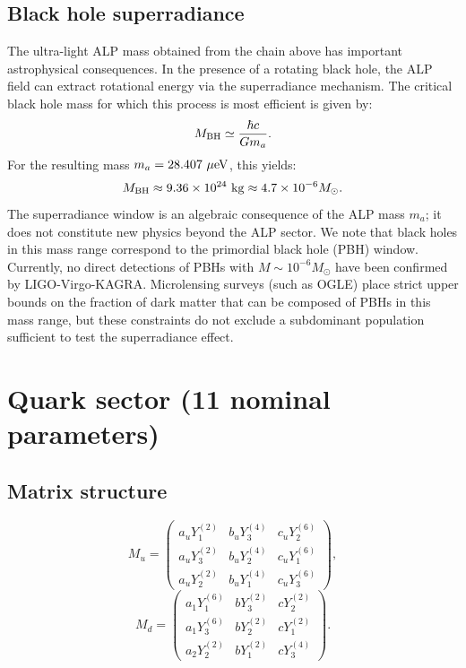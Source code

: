 \documentclass[12pt,a4paper]{article}
\numberwithin{equation}{section}
\begin{document}
\subsection{Black hole superradiance}
The ultra-light ALP mass obtained from the chain above has important astrophysical consequences. In the presence of a rotating black hole, the ALP field can extract rotational energy via the superradiance mechanism. The critical black hole mass for which this process is most efficient is given by:
\begin{equation}
M_{\rm BH}\simeq \frac{\hbar c}{Gm_a}.
\end{equation}
For the resulting mass \(m_a = 28.407~\mu{\rm eV}\), this yields:
\begin{equation}
M_{\rm BH}\approx 9.36\times 10^{24}~{\rm kg}\approx 4.7\times 10^{-6}M_{\odot}.
\end{equation}
The superradiance window is an algebraic consequence of the ALP mass \(m_a\); it does not constitute new physics beyond the ALP sector. We note that black holes in this mass range correspond to the primordial black hole (PBH) window. Currently, no direct detections of PBHs with \(M\sim 10^{-6}M_{\odot}\) have been confirmed by LIGO-Virgo-KAGRA. Microlensing surveys (such as OGLE) place strict upper bounds on the fraction of dark matter that can be composed of PBHs in this mass range, but these constraints do not exclude a subdominant population sufficient to test the superradiance effect.

\section{Quark sector (11 nominal parameters)}
\subsection{Matrix structure}
\begin{equation}
M_u = \begin{pmatrix}
a_u Y_1^{(2)} & b_u Y_3^{(4)} & c_u Y_2^{(6)} \\
a_u Y_3^{(2)} & b_u Y_2^{(4)} & c_u Y_1^{(6)} \\
a_u Y_2^{(2)} & b_u Y_1^{(4)} & c_u Y_3^{(6)}
\end{pmatrix},
\end{equation}
\begin{equation}
M_d = \begin{pmatrix}
a_1 Y_1^{(6)} & b Y_3^{(2)} & c Y_2^{(2)} \\
a_1 Y_3^{(6)} & b Y_2^{(2)} & c Y_1^{(2)} \\
a_2 Y_2^{(2)} & b Y_1^{(2)} & c Y_3^{(4)}
\end{pmatrix}.
\end{equation}
\end{document}
